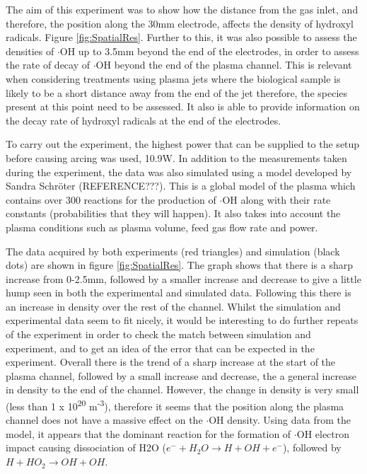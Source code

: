\documentclass[11pt, oneside]{article}   	%
\begin{document}
The aim of this experiment was to show how the distance from the gas inlet, and therefore, the position along the 30mm electrode, affects the density of hydroxyl radicals. Figure \ref{fig:SpatialRes}.
Further to this, it was also possible to assess the densities of $\cdot$OH up to 3.5mm beyond the end of the electrodes, in order to assess the rate of decay of $\cdot$OH beyond the end of the plasma channel.
This is relevant when considering treatments using plasma jets where the biological sample is likely to be a short distance away from the end of the jet therefore, the species present at this point need to be assessed.
It also is able to provide information on the decay rate of hydroxyl radicals at the end of the electrodes.

To carry out the experiment, the highest power that can be supplied to the setup before causing arcing was used, 10.9W.
In addition to the measurements taken during the experiment, the data was also simulated using a model developed by Sandra Schr\"{o}ter (REFERENCE???).
This is a global model of the plasma which contains over 300 reactions for the production of $\cdot$OH along with their rate constants (probabilities that they will happen). It also takes into account the plasma conditions such as plasma volume, feed gas flow rate and power. 

The data acquired by both experiments (red triangles) and simulation (black dots) are shown in figure \ref{fig:SpatialRes}.
The graph shows that there is a sharp increase from 0-2.5mm, followed by a smaller increase and decrease to give a little hump seen in both the experimental and simulated data. Following this there is an increase in density over the rest of the channel.
Whilst the simulation and experimental data seem to fit nicely, it would be interesting to do further repeats of the experiment in order to check the match between simulation and experiment, and to get an idea of the error that can be expected in the experiment.
Overall there is the trend of a sharp increase at the start of the plasma channel, followed by a small increase and decrease, the a general increase in density to the end of the channel. 
However, the change in density is very small (less than 1 x 10\textsuperscript{20} m\textsuperscript{-3}), therefore it seems that the position along the plasma channel does not have a massive effect on the $\cdot$OH density.
Using data from the model, it appears that the dominant reaction for the formation of $\cdot$OH electron impact causing dissociation of H2O ($e^- + H_2O \rightarrow H + OH + e^-$), followed by $H + HO_2 \rightarrow OH + OH$.
\end{document}
